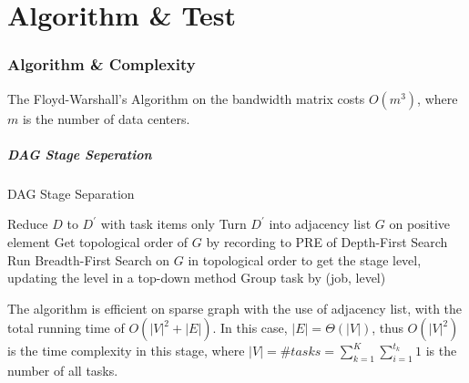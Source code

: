 \part{Algorithm \& Test}
\section{Algorithm \& Complexity}

\begin{frame}
 The Floyd-Warshall's Algorithm on the bandwidth matrix costs $O(m^3)$, where $m$ is the number of data centers.
\end{frame}

\begin{frame}
\frametitle{DAG Stage Seperation}
\begin{algorithm}[H]
\caption{DAG Stage Separation}
Reduce $D$ to $D^\prime$ with task items only\;
Turn $D^\prime$ into adjacency list $G$ on positive element\;
Get topological order of $G$ by recording to \textsc{PRE} of Depth-First Search\;
Run Breadth-First Search on $G$ in topological order to get the stage level, updating the level in a top-down method\;
Group task by (job, level)\;
\end{algorithm}
The algorithm is efficient on sparse graph with the use of adjacency list, with the total running time of $O(|V|^2+|E|)$. In this case, $|E|=\Theta(|V|)$, thus $O(|V|^2)$ is the time complexity in this stage, where $|V|=\# tasks=\sum_{k=1}^K\sum_{i=1}^{t_k}1$ is the number of all tasks.
\end{frame}

